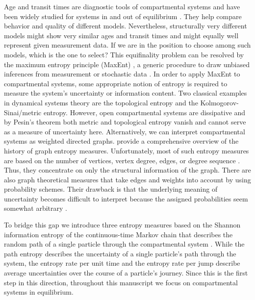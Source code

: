 \documentclass[smallextended]{svjour3}
\begin{document}
Age and transit times are diagnostic tools of compartmental systems and have been widely studied for systems in and out of equilibrium \citep{Eriksson1971ARoEaS, Bolin1973tellus, Rasmussen2016JMB, Sierra2016GlobChangBiol, Metzler2018MGS, MetzlerMuellerSierra2018PNAS}.
They help compare behavior and quality of different models.
Nevertheless, structurally very different models might show very similar ages and transit times and might equally well represent given measurement data.
If we are in the position to choose among such models, which is the one to select?
This equifinality problem can be resolved by the maximum entropy principle (MaxEnt) \citep{Jaynes1957PR1, Jaynes1957PR2}, a generic procedure to draw unbiased inferences from measurement or stochastic data \citep{Presse2013RMP}.
In order to apply MaxEnt to compartmental systems, some appropriate notion of entropy is required to measure the system's uncertainty or information content.
Two classical examples in dynamical systems theory are the topological entropy and the Kolmogorov-Sinai/metric entropy.
However, open compartmental systems are dissipative and by Pesin's theorem \citep{Pesin1977UMN} both metric and topological entropy vanish and cannot serve as a measure of uncertainty here.
Alternatively, we can interpret compartmental systems as weighted directed graphs.
\citet{Dehmer2011IS} provide a comprehensive overview of the history of graph entropy measures.
Unfortunately, most of such entropy measures are based on the number of vertices, vertex degree, edges, or degree sequence \citep{Trucco1956BoMB}.
Thus, they concentrate on only the structural information of the graph.
There are also graph theoretical measures that take edges and weights into account by using probability schemes.
Their drawback is that the underlying meaning of uncertainty becomes difficult to interpret because the assigned probabilities seem somewhat arbitrary \citep{Bonchev2005}.

To bridge this gap we introduce three entropy measures based on the Shannon information entropy \citep{Shannon1949TUoIP} of the continuous-time Markov chain that describes the random path of a single particle through the compartmental system \citep{Metzler2018MGS}.
While the path entropy describes the uncertainty of a single particle's path through the system, the entropy rate per unit time and the entropy rate per jump describe average uncertainties over the course of a particle's journey.
Since this is the first step in this direction, throughout this manuscript we focus on compartmental systems in equilibrium.
\end{document}
